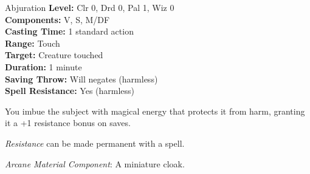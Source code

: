 {Abjuration}
{
	\textbf{Level:}
	Clr 0, Drd 0, Pal 1, Wiz 0\\
	\textbf{Components:}
	V, S, M/DF\\
	\textbf{Casting Time:}
	1 standard action\\
	\textbf{Range:}
	Touch\\
	\textbf{Target:}
	Creature touched\\
	\textbf{Duration:}
	1 minute\\
	\textbf{Saving Throw:}
	Will negates (harmless)\\
	\textbf{Spell Resistance:}
	Yes (harmless)\\
}
{
	You imbue the subject with magical energy that protects it from harm, granting it a +1 resistance bonus on saves.

	\emph{Resistance} can be made permanent with a  spell.

	\textit{Arcane Material Component}:
	A miniature cloak.

}
